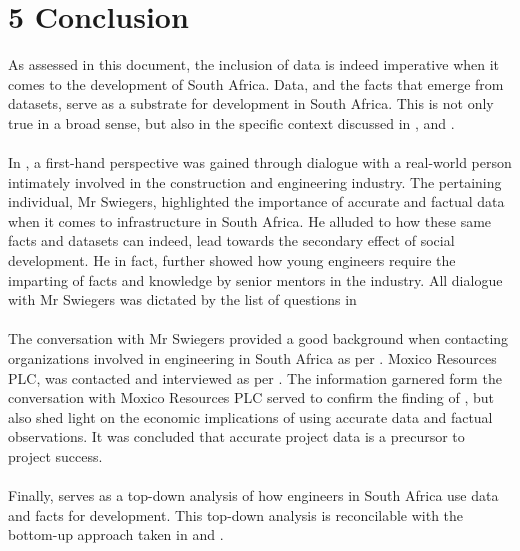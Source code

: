 \chapter*{5 Conclusion}
\label{conc}
As assessed in this document, the inclusion of data is indeed imperative when it comes to the development of South Africa. Data, and the facts that emerge from datasets, serve as a substrate for development in South Africa. This is not only true in a broad sense, but also in the specific context discussed in \textbf{}, \textbf{} and \textbf{}.
\\\\
In \textbf{}, a first-hand perspective was gained through dialogue with a real-world person intimately involved in the construction and engineering industry. The pertaining individual, Mr Swiegers, highlighted the importance of accurate and factual data when it comes to infrastructure in South Africa. He alluded to how these same facts and datasets can indeed, lead towards the secondary effect of social development. He in fact, further showed how young engineers require the imparting of facts and knowledge by senior mentors in the industry. All dialogue with Mr Swiegers was dictated by the list of questions in \textbf{}
\\\\
The conversation with Mr Swiegers provided a good background when contacting organizations involved in engineering in South Africa as per \textbf{}. Moxico Resources PLC, was contacted and interviewed as per \textbf{}. The information garnered form the conversation with Moxico Resources PLC served to confirm the finding of \textbf{}, but also shed light on the economic implications of using accurate data and factual observations. It was concluded that accurate project data is a precursor to project success. 
\\\\
Finally, \textbf{} serves as a top-down analysis of how engineers in South Africa use data and facts for development. This top-down analysis is reconcilable with the bottom-up approach taken in \textbf{} and \textbf{}.